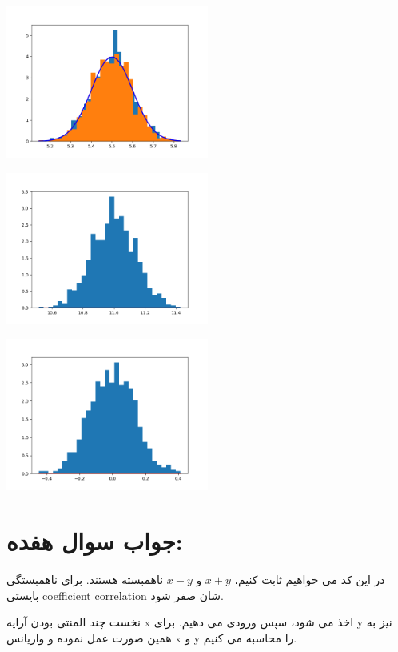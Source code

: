 \documentclass[a4paper,14pt]{article}
\begin{document}
\begin{center}
	\includegraphics[width=0.5\textwidth]{Figures/fig_3.png}
\end{center}

\begin{center}
	\includegraphics[width=0.5\textwidth]{Figures/fig_4.png}
\end{center}


\begin{center}
	\includegraphics[width=0.5\textwidth]{Figures/fig_5.png}
\end{center}


\section*{جواب سوال هفده:}
در این کد می خواهیم ثابت کنیم،
$x+y$ 
و
$x-y$
ناهمبسته هستند.
برای ناهمبستگی بایستی
coefficient correlation 
شان صفر شود.

\noindent نخست چند المنتی بودن آرایه x اخذ می شود، سپس ورودی می دهیم. برای y نیز به همین صورت عمل نموده و واریانس x و y را محاسبه می کنیم.
\end{document}
